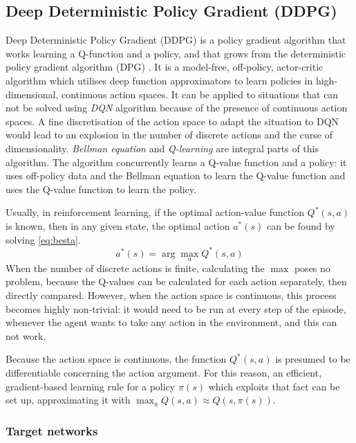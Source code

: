 \subsection{Deep Deterministic Policy Gradient (DDPG)} \label{ddpg}

Deep Deterministic Policy Gradient (DDPG) \cite{lillicrap2015continuous} is a policy gradient algorithm that works learning a Q-function and a policy, and that grows from the deterministic policy gradient algorithm (DPG) \cite{silver2014deterministic}.
It is a model-free, off-policy, actor-critic algorithm which utilises deep function approximators to learn policies in high-dimensional, continuous action spaces.
It can be applied to situations that can not be solved using \textit{DQN} algorithm \cite{mnih2015human} because of the presence of continuous action spaces.
A fine discretisation of the action space to adapt the situation to DQN would lead to an explosion in the number of discrete actions and the curse of dimensionality.
\textit{Bellman equation} and \textit{Q-learning} are integral parts of this algorithm.
The algorithm concurrently learns a Q-value function and a policy: it uses off-policy data and the Bellman equation to learn the Q-value function and uses the Q-value function to learn the policy.

Usually, in reinforcement learning, if the optimal action-value function $Q^*(s,a)$ is known, then in any given state, the optimal action $a^*(s)$ can be found by solving \vref{eq:besta}.
\begin{equation} \label{eq:besta}
	a^*(s) = \arg \max_a Q^*(s,a)
\end{equation}
When the number of discrete actions is finite, calculating the $\max$ poses no problem, because the Q-values can be calculated for each action separately, then directly compared.
However, when the action space is continuous, this process becomes highly non-trivial: it would need to be run at every step of the episode, whenever the agent wants to take any action in the environment, and this can not work.

Because the action space is continuous, the function $Q^*(s,a)$ is presumed to be differentiable concerning the action argument.
For this reason, an efficient, gradient-based learning rule for a policy $\pi(s)$ which exploits that fact can be set up, approximating it with $\max_a Q(s,a) \approx Q(s,\pi(s))$.

\subsubsection{Target networks} \label{targetnet}

